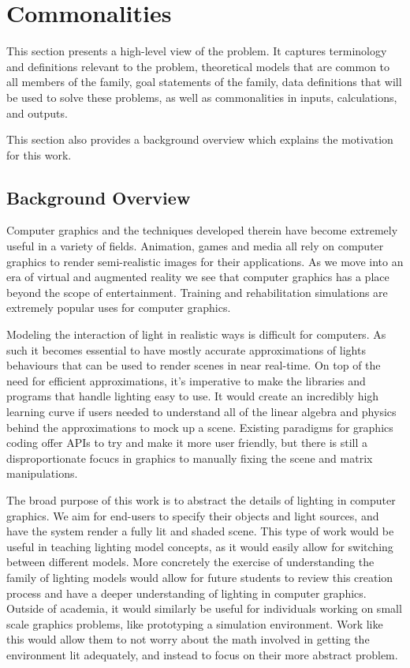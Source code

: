 \documentclass[12pt]{article}
\begin{document}
\section{Commonalities}
This section presents a high-level view of the problem. It captures terminology 
and definitions relevant to the problem, theoretical models that are common to 
all members of the family, goal statements of the family, data definitions that 
will be used to solve these problems, as well as commonalities in inputs, 
calculations, and outputs.

This section also provides a background overview which explains the motivation 
for this work.

\subsection{Background Overview} \label{Sec_Background}
Computer graphics and the techniques developed therein have become extremely 
useful in a variety of fields. Animation, games and media all rely on computer 
graphics to render semi-realistic images for their applications. As we move 
into an era of virtual and augmented reality we see that computer graphics has 
a place beyond the scope of entertainment. Training and rehabilitation 
simulations are extremely popular uses for computer graphics.

Modeling the interaction of light in realistic ways is difficult for computers. 
As such it becomes essential to have mostly accurate approximations of lights 
behaviours that can be used to render scenes in near real-time. On top of the 
need for efficient approximations, it's imperative to make the libraries and 
programs that handle lighting easy to use. It would create an incredibly high 
learning curve if users needed to understand all of the linear algebra and 
physics behind the approximations to mock up a scene. Existing paradigms for 
graphics coding offer APIs to try and make it more user friendly, but there is 
still a disproportionate focucs in graphics to manually fixing the scene and 
matrix manipulations. 

The broad purpose of this work is to abstract the details of lighting in 
computer graphics. We aim for end-users to specify their objects and light 
sources, and have the system render a fully lit and shaded scene. This type of 
work would be useful in teaching lighting model concepts, as it would easily 
allow for switching between different models. More concretely the exercise of 
understanding the family of lighting models would allow for future students to 
review this creation process and have a deeper understanding of lighting in 
computer graphics. Outside of academia, it would similarly be useful for 
individuals working on small scale graphics problems, like prototyping a 
simulation environment. Work like this would allow them to not worry about the 
math involved in getting the environment lit adequately, and instead to focus 
on their more abstract problem.
\end{document}
